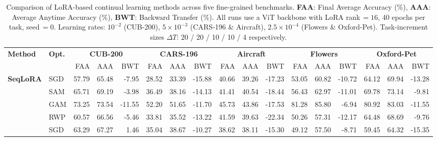 
\begin{table}[ht]
\centering
\caption{%
  Comparison of LoRA-based continual learning methods across five fine-grained benchmarks.
  \textbf{FAA}: Final Average Accuracy (\%), \textbf{AAA}: Average Anytime Accuracy (\%),
  \textbf{BWT}: Backward Transfer (\%).
  All runs use a ViT backbone with LoRA rank\,$=16$, 40 epochs per task, seed\,$=0$.
  Learning rates: $10^{-2}$ (CUB-200), $5{\times}10^{-3}$ (CARS-196 \& Aircraft),
  $2.5{\times}10^{-4}$ (Flowers \& Oxford-Pet).
  Task-increment sizes $\Delta T$: 20 / 20 / 10 / 10 / 4 respectively.
}
\label{tab:main_results}
\setlength{\tabcolsep}{2.8pt}
\renewcommand{\arraystretch}{0.90}
\scriptsize
\begin{tabular}{@{}l l r r r r r r r r r r r r r r r@{}}
\toprule
\textbf{Method} & \textbf{Opt.} & \multicolumn{3}{c}{\textbf{CUB-200}} & \multicolumn{3}{c}{\textbf{CARS-196}} & \multicolumn{3}{c}{\textbf{Aircraft}} & \multicolumn{3}{c}{\textbf{Flowers}} & \multicolumn{3}{c}{\textbf{Oxford-Pet}} \\
\cmidrule(lr){3-5}\cmidrule(lr){6-8}\cmidrule(lr){9-11}\cmidrule(lr){12-14}\cmidrule(lr){15-17}
 &  & FAA & AAA & BWT & FAA & AAA & BWT & FAA & AAA & BWT & FAA & AAA & BWT & FAA & AAA & BWT \\
\midrule
\multirow{4}{*}{\textbf{SeqLoRA}} & SGD & 57.79 & 65.48 & -7.95 & 28.52 & 33.39 & -15.88 & 40.66 & 39.26 & -17.23 & 53.05 & 60.82 & -10.72 & 64.12 & 69.94 & -13.28 \\
 & SAM & 65.71 & 69.19 & -3.98 & 36.49 & 38.16 & -14.13 & 41.41 & 40.54 & -18.44 & 56.43 & 62.97 & -11.01 & 69.78 & 73.14 & -9.81 \\
 & GAM & 73.25 & 73.54 & -11.55 & 52.20 & 51.65 & -11.70 & 45.73 & 43.86 & -17.53 & 81.28 & 85.80 & -6.94 & 80.92 & 83.03 & -11.55 \\
 & RWP & 60.57 & 66.56 & -5.46 & 33.81 & 35.52 & -13.22 & 41.59 & 39.63 & -22.34 & 50.26 & 57.31 & -12.17 & 64.48 & 68.69 & -9.76 \\
\addlinespace[2pt]
\multirow{4}{*}{\textbf{IncLoRA}} & SGD & 63.29 & 67.27 & 1.46 & 35.04 & 38.67 & -10.27 & 38.62 & 38.11 & -15.30 & 49.12 & 57.50 & -8.71 & 59.45 & 64.32 & -15.35 \\

\end{tabular}
\end{table}
